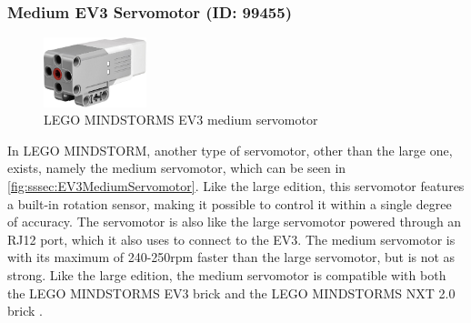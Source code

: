 \subsubsection{Medium EV3 Servomotor (ID: 99455)}
\begin{figure}[H]
  \centering
  \includegraphics[width=3cm]{images/techAnalysis/LegoEV3MediumServomotor.jpg}
  \caption{LEGO MINDSTORMS EV3 medium servomotor \cite{BrickOWl-figure-EV3-mediumServo}}\label{fig:sssec:EV3MediumServomotor}
\end{figure}
In LEGO MINDSTORM, another type of servomotor, other than the large one, exists, namely the medium servomotor, which can be seen in \autoref{fig:sssec:EV3MediumServomotor}.
Like the large edition, this servomotor features a built-in rotation sensor, making it possible to control it within a single degree of accuracy.
The servomotor is also like the large servomotor powered through an RJ12 port, which it also uses to connect to the EV3.
The medium servomotor is with its maximum of 240-250rpm faster than the large servomotor, but is not as strong.
Like the large edition, the medium servomotor is compatible with both the LEGO MINDSTORMS EV3 brick and the LEGO MINDSTORMS NXT 2.0 brick \cite{lego_lego_EV3NXTCompatibility}. \cite{LEGO_mindstorms_2013-1}
